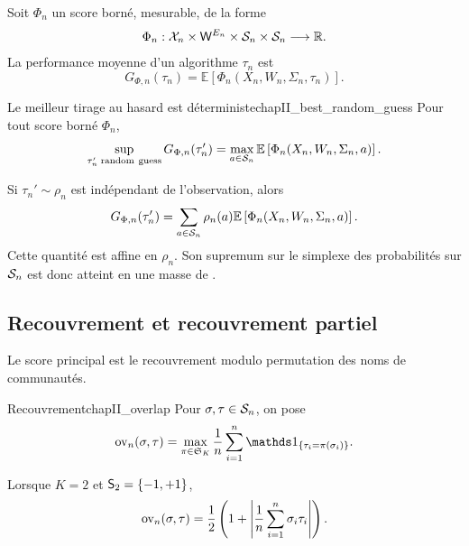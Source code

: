 Soit $\Phi_n$ un score borné, mesurable, de la forme
\[
    \Phi_n:\mathcal X_n\times \mathsf W^{E_n}\times\mathcal S_n\times\mathcal S_n\longrightarrow\mathbb R.
\]
La performance moyenne d'un algorithme $\tau_n$ est
\begin{equation}
    G_{\Phi,n}(\tau_n)
    =
    \mathbb E\left[\Phi_n(X_n,W_n,\Sigma_n,\tau_n)\right].
    \label{eq:chapII_score_general}
\end{equation}

\begin{Fait}{Le meilleur tirage au hasard est déterministe}{chapII_best_random_guess}
Pour tout score borné $\Phi_n$,
\begin{equation}
    \sup_{\tau_n'\;\mathrm{random\ guess}}G_{\Phi,n}(\tau_n')
    =
    \max_{a\in\Conf_n}
    \mathbb E\left[\Phi_n(X_n,W_n,\Sigma_n,a)\right].
    \label{eq:chapII_best_guess_deterministe}
\end{equation}
\end{Fait}

\begin{Preuve}
Si $\tau_n'\sim\rho_n$ est indépendant de l'observation, alors
\[
    G_{\Phi,n}(\tau_n')
    =
    \sum_{a\in\mathcal S_n}\rho_n(a)
    \mathbb E\left[\Phi_n(X_n,W_n,\Sigma_n,a)\right].
\]
Cette quantité est affine en $\rho_n$. Son supremum sur le simplexe des probabilités sur $\mathcal S_n$ est donc atteint en une masse de .
\end{Preuve}

\subsection{Recouvrement et recouvrement partiel}

Le score principal est le recouvrement modulo permutation des noms de communautés.

\begin{Definition}{Recouvrement}{chapII_overlap}
Pour $\sigma,\tau\in\mathcal S_n$, on pose
\begin{equation}
    \ov_n(\sigma,\tau)
    =
    \max_{\pi\in\mathfrak S_K}
    \frac1n\sum_{i=1}^n \ind{\tau_i=\pi(\sigma_i)}.
    \label{eq:chapII_overlap}
\end{equation}
\end{Definition}

Lorsque $K=2$ et $\mathsf S_2=\{-1,+1\}$,
\begin{equation}
    \operatorname{ov}_n(\sigma,\tau)
    =
    \frac12\left(1+\left|\frac1n\sum_{i=1}^n\sigma_i\tau_i\right|\right).
    \label{eq:chapII_overlap_spins}
\end{equation}


